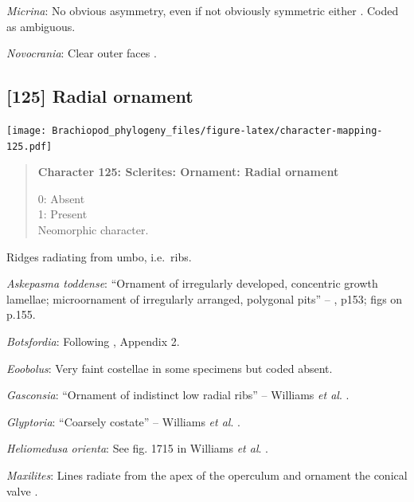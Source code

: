 \documentclass[openany]{book}
\begin{document}
\hypertarget{Micrina-coding-124}{}
\emph{Micrina}: No obvious asymmetry, even if not obviously symmetric
either \citep{Holmer2008TheEarly}. Coded as ambiguous.

\hypertarget{Novocrania-coding-124}{}
\emph{Novocrania}: Clear outer faces \citep[fig.
100.2b]{Williams2000LinguliformeaCraniiformea}.

\subsection*{{[}125{]} Radial ornament}\label{radial-ornament}

\texttt{[image: Brachiopod\_phylogeny\_files/figure-latex/character-mapping-125.pdf]}

\begin{quote}
\textbf{Character 125: Sclerites: Ornament: Radial ornament}

0: Absent\\
1: Present\\
Neomorphic character.
\end{quote}

Ridges radiating from umbo, i.e.~ribs.

\hypertarget{Askepasma_toddense-coding-125}{}
\emph{Askepasma toddense}: ``Ornament of irregularly developed,
concentric growth lamellae; microornament of irregularly arranged,
polygonal pits'' -- \citet{Williams2000LinguliformeaCraniiformea}, p153;
figs on p.155.

\hypertarget{Botsfordia-coding-125}{}
\emph{Botsfordia}: Following \citet{Williams1998Thediversity}, Appendix
2.

\hypertarget{Eoobolus-coding-125}{}
\emph{Eoobolus}: Very faint costellae in some specimens but coded
absent.

\hypertarget{Gasconsia-coding-125}{}
\emph{Gasconsia}: ``Ornament of indistinct low radial ribs'' -- Williams
\emph{et al}. \citeyearpar[p167]{Williams2000LinguliformeaCraniiformea}.

\hypertarget{Glyptoria-coding-125}{}
\emph{Glyptoria}: ``Coarsely costate'' -- Williams \emph{et al}.
\citeyearpar[p710]{Williams2000LinguliformeaCraniiformea}.

\hypertarget{Heliomedusa_orienta-coding-125}{}
\emph{Heliomedusa orienta}: See fig. 1715 in Williams \emph{et al}.
\citeyearpar{Williams2007Supplement}.

\hypertarget{Maxilites-coding-125}{}
\emph{Maxilites}: Lines radiate from the apex of the operculum
\citep[pl.2 fig. 5]{Marek1972} and ornament the conical valve \citep[pl.
2. fig. 3]{Marek1972}.
\end{document}

